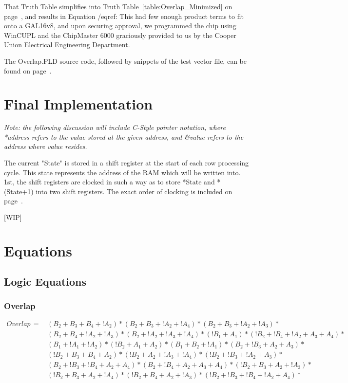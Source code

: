 \documentclass[letterpaper,titlepage,oneside]{article}
\begin{document}
That Truth Table simplifies into Truth Table~\ref{table:Overlap_Minimized} on page~\pageref{table:Overlap_Minimized}, and results in Equation /eqref{}: 
This had few enough product terms to fit onto a GAL16v8, and upon securing approval, we programmed the chip using WinCUPL and the ChipMaster 6000 graciously provided to us by the Cooper Union Electrical Engineering Department.

The Overlap.PLD source code, followed by snippets of the test vector file, can be found on page~\pageref{code:Overlap}.

\clearpage

\section{Final Implementation}
\textit{Note: the following discussion will include C-Style pointer notation, where *address refers to the value stored at the given address, and \&value refers to the address where value resides.}

The current "State" is stored in a shift register at the start of each row processing cycle. This state represents the address of the RAM which will be written into. 1st, the shift registers are clocked in such a way as to store *State and *(State+1) into two shift registers. The exact order of clocking is included on page~\pageref{table:Clock}.

[WIP]

\section{Equations}
\subsection{Logic Equations}

\subsubsection{Overlap}

\begin{align*} 
Overlap\,=\, 	&(B_{2}+B_{3}+B_{4}+!A_{2})*(B_{2}+B_{3}+!A_{2}+!A_{4})*(B_{2}+B_{3}+!A_{2}+!A_{3})*\\
			&(B_{2}+B_{4}+!A_{2}+!A_{3})*(B_{2}+!A_{2}+!A_{3}+!A_{4})*(!B_{1}+A_{1})*(!B_{2}+!B_{4}+!A_{2}+A_{3}+A_{4})*\\
			&(B_{1}+!A_{1}+!A_{2})*(!B_{2}+A_{1}+A_{2})*(B_{1}+B_{2}+!A_{1})*(B_{2}+!B_{3}+A_{2}+A_{3})*\\
&(!B_{2}+B_{3}+B_{4}+A_{2})*(!B_{2}+A_{2}+!A_{3}+!A_{4})*(!B_{2}+!B_{3}+!A_{2}+A_{3})*\\
&(B_{2}+!B_{3}+!B_{4}+A_{2}+A_{4})*(B_{2}+!B_{4}+A_{2}+A_{3}+A_{4})*(!B_{2}+B_{3}+A_{2}+!A_{3})*\\
&(!B_{2}+B_{3}+A_{2}+!A_{4})*(!B_{2}+B_{4}+A_{2}+!A_{3})*(!B_{2}+!B_{3}+!B_{4}+!A_{2}+A_{4})*\\
\end{align*}
\end{document}
